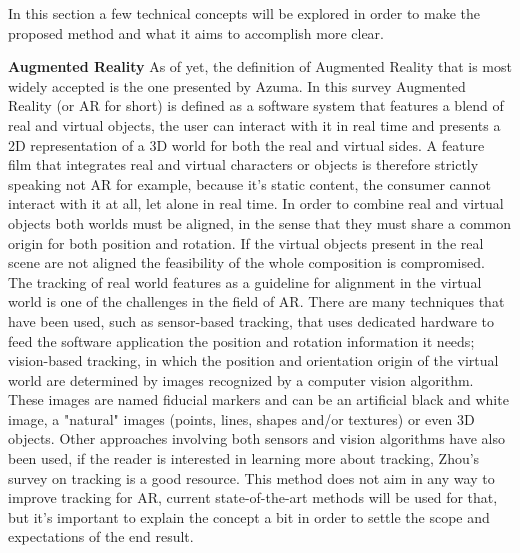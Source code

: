 
In this section a few technical concepts will be explored in order to make the proposed method and what it aims to accomplish more clear.

\textbf{Augmented Reality}\newline
As of yet, the definition of Augmented Reality that is most widely accepted is the one presented by Azuma\cite{azuma1997}. In this survey Augmented Reality (or AR for short) is defined as a software system that features a blend of real and virtual objects, the user can interact with it in real time and presents a 2D representation of a 3D world for both the real and virtual sides. A feature film that integrates real and virtual characters or objects is therefore strictly speaking not AR for example, because it's static content, the consumer cannot interact with it at all, let alone in real time.
In order to combine real and virtual objects both worlds must be aligned, in the sense that they must share a common origin for both position and rotation. If the virtual objects present in the real scene are not aligned the feasibility of the whole composition is compromised. The tracking of real world features as a guideline for alignment in the virtual world is one of the challenges in the field of AR. There are many techniques that have been used, such as sensor-based tracking, that uses dedicated hardware to feed the software application the position and rotation information it needs; vision-based tracking, in which the position and orientation origin of the virtual world are determined by images recognized by a computer vision algorithm. These images are named fiducial markers and can be an artificial black and white image, a "natural" images (points, lines, shapes and/or textures) or even 3D objects. Other approaches involving both sensors and vision algorithms have also been used, if the reader is interested in learning more about tracking, Zhou's survey\cite{zhou2008} on tracking is a good resource.
This method does not aim in any way to improve tracking for AR, current state-of-the-art methods will be used for that, but it's important to explain the concept a bit in order to settle the scope and expectations of the end result.

